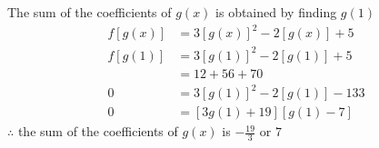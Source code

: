 \documentclass[12pt]{article}
\begin{document}
\begin{enumerate}
    The sum of the coefficients of $g(x)$ is obtained by finding $g(1)$
    \begin{align*}
        f[g(x)] &= 3[g(x)]^2 - 2[g(x)] + 5 \\
        f[g(1)] &= 3[g(1)]^2 - 2[g(1)] + 5 \\
        &= 12 + 56 + 70 \\
        0 &=3[g(1)]^2 - 2[g(1)] - 133 \\
        0 &= [3g(1) + 19][g(1) - 7]
    \end{align*}
    $\therefore$ the sum of the coefficients of $g(x)$ is $-\frac{19}{3}$ or $7$
\end{enumerate}
\end{document}
